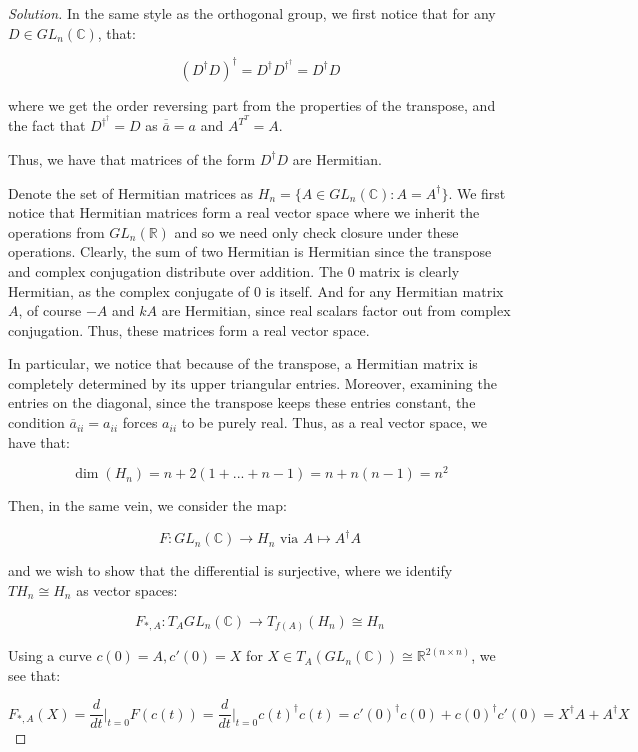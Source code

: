 \documentclass[10pt]{article}
\begin{document}
\begin{proof}[Solution]

In the same style as the orthogonal group, we first notice that for any $D \in GL_n(\mathbb{C})$, that:

$$ (D^\dag D)^\dag  = D^\dag D^{\dag^\dag} = D^\dag D $$

where we get the order reversing part from the properties of the transpose, and the fact that $ D^{\dag^\dag} = D$ as $\overline{\overline{a}} = a$ and $A^{T^T} = A$.

Thus, we have that matrices of the form $ D^\dag D$ are Hermitian.

Denote the set of Hermitian matrices as $H_n = \{ A \in GL_n(\mathbb{C}) : A = A^\dag \}$. We first notice that Hermitian matrices form a real vector space where we inherit the operations from $GL_n(\mathbb{R})$ and so we need only check closure under these operations. Clearly, the sum of two Hermitian is Hermitian  since the transpose and complex conjugation distribute over addition. The 0 matrix is clearly Hermitian, as the complex conjugate of 0 is itself. And for any Hermitian matrix $A$, of course $-A$ and $kA$ are Hermitian, since real scalars factor out from complex conjugation. Thus, these matrices form a real vector space.

In particular, we notice that because of the transpose, a Hermitian matrix is completely determined by its upper triangular entries. Moreover, examining the entries on the diagonal, since the transpose keeps these entries constant, the condition $\overline{a}_{ii} = a_{ii}$ forces $a_{ii}$ to be purely real. Thus, as a real vector space, we have that:

$$ \dim(H_n) = n + 2( 1 + ... + n-1) = n + n(n-1) = n^2$$ 

Then, in the same vein, we consider the map:

$$ F: GL_n(\mathbb{C}) \to H_n \text{ via } A \mapsto A^\dag A$$

and we wish to show that the differential is surjective, where we identify $T H_n \cong H_n$ as vector spaces:

$$F_{*, A}: T_A GL_n(\mathbb{C}) \to T_{f(A)}(H_n) \cong H_n $$

Using a curve $c(0) = A, c'(0) = X$ for $X \in T_A(GL_n(\mathbb{C})) \cong \mathbb{R}^{2(n \times n)}$, we see that:

$$ F_{*, A} (X) = \frac{d}{dt}\bigg|_{t=0} F(c(t)) = \frac{d}{dt}\bigg|_{t=0} c(t)^\dag c(t)  = c'(0)^\dag c(0) + c(0)^\dag c'(0) = X^\dag A + A^\dag X $$


\end{proof}
\end{document}
